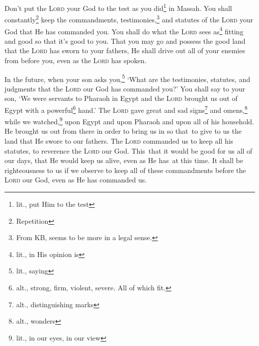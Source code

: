 \begin{inparaenum}
     Don't put the \textsc{Lord} your God to the test as you did\footnote{lit., put Him to the test} in Massah.%
     You shall constantly\footnote{Repetition} keep the commandments, testimonies,\footnote{From KB, seems to be more in a legal sense.} and statutes of the \textsc{Lord} your God that He has commanded you.%
     You shall do what the \textsc{Lord} sees as\footnote{lit., in His opinion is} fitting and good so that it's good to you. That you may go and possess the good land that the \textsc{Lord} has sworn to your fathers,%
     He shall drive out all of your enemies from before you, even as the \textsc{Lord} has spoken.%
    
     In the future, when your son asks you,\footnote{lit., saying} `What are the testimonies, statutes, and judgments that the \textsc{Lord} our God has commanded you?'%
     You shall say to your son, `We were servants to Pharaoh in Egypt and the \textsc{Lord} brought us out of Egypt with a powerful\footnote{alt., strong, firm, violent, severe. All of which fit.} hand.'%
     The \textsc{Lord} gave great and sad signs\footnote{alt., distinguishing marks} and omens,\footnote{alt., wonders} while we watched,\footnote{lit., in our eyes, in our view} upon Egypt and upon Pharaoh and upon all of his household.%
     He brought us out from there in order to bring us in so that\understood\ to give to us the land that He swore to our fathers.%
     The \textsc{Lord} commanded us to keep all his statutes, to reverence the \textsc{Lord} our God. This\understood\ that it would be good for us all of our days, that He would keep us alive, even as He has\understood\ at this time.%
     It shall be righteousness to us if we observe to keep all of these commandments before the \textsc{Lord} our God, even as He has commanded us.%
\end{inparaenum}

